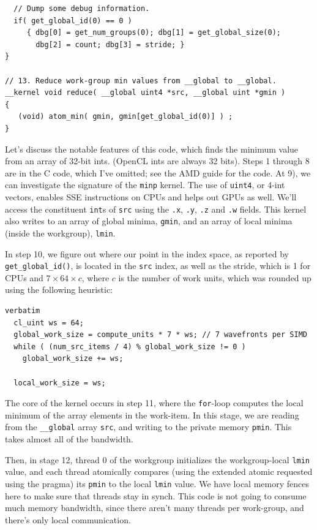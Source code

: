 \documentclass[a4paper]{report}
\begin{document}
{\begin{lstlisting}
  // Dump some debug information.                             
  if( get_global_id(0) == 0 )
     { dbg[0] = get_num_groups(0); dbg[1] = get_global_size(0); 
       dbg[2] = count; dbg[3] = stride; }
}
                                                               
// 13. Reduce work-group min values from __global to __global. 
__kernel void reduce( __global uint4 *src, __global uint *gmin )                    
{                                                              
   (void) atom_min( gmin, gmin[get_global_id(0)] ) ;           
}                                                              
\end{lstlisting}
}

Let's discuss the notable features of this code, which finds the
minimum value from an array of 32-bit ints. (OpenCL ints are always 32
bits). Steps 1 through 8 are in the C code, which I've omitted; see
the AMD guide for the code. At 9), we can investigate the signature of
the {\tt minp} kernel. The use of {\tt uint4}, or 4-int vectors,
enables SSE instructions on CPUs and helps out GPUs as well. We'll
access the constituent {\tt int}s of {\tt src} using the {\tt .x},
{\tt .y}, {\tt .z} and {\tt .w} fields.  This kernel also writes to an
array of global minima, {\tt gmin}, and an array of local minima
(inside the workgroup), {\tt lmin}.

In step 10, we figure out where our point in the index space, as
reported by {\tt get\_global\_id()}, is located in the {\tt src}
index, as well as the stride, which is 1 for CPUs and $7 \times 64
\times c$, where $c$ is the number of work units, which was rounded up
using the following heuristic:

{
\begin{lstlisting}verbatim
  cl_uint ws = 64;
  global_work_size = compute_units * 7 * ws; // 7 wavefronts per SIMD
  while ( (num_src_items / 4) % global_work_size != 0 )
    global_work_size += ws;

  local_work_size = ws;
\end{lstlisting}
}


The core of the kernel occurs in step 11, where the {\tt for}-loop
computes the local minimum of the array elements in the work-item.  In
this stage, we are reading from the {\tt \_\_global} array {\tt src},
and writing to the private memory {\tt pmin}. This takes almost all of
the bandwidth. 

Then, in stage 12, thread 0 of the workgroup initializes the
workgroup-local {\tt lmin} value, and each thread atomically compares
(using the extended atomic requested using the pragma) its {\tt pmin}
to the local {\tt lmin} value.  We have local memory fences here to
make sure that threads stay in synch.  This code is not going to
consume much memory bandwidth, since there aren't many threads per
work-group, and there's only local communication.
\end{document}
